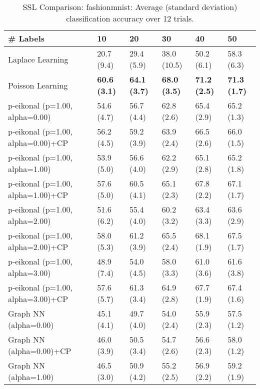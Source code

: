 \documentclass{article}
\begin{document}
\begin{table*}[t!]
\vspace{-3mm}
\caption{SSL Comparison: fashionmnist: Average (standard deviation) classification accuracy over 12 trials.}
\vspace{-3mm}
\label{tab:SSL Comparison: fashionmnist}
\vskip 0.15in
\begin{center}
\begin{small}
\begin{sc}
\begin{tabular}{llllll}
\toprule
\# Labels&\textbf{10}&\textbf{20}&\textbf{30}&\textbf{40}&\textbf{50}\\
\midrule
Laplace Learning&20.7 (9.4)      &29.4 (5.9)      &38.0 (10.5)      &50.2 (6.1)      &58.3 (6.3)      \\
Poisson Learning&{\bf 60.6 (3.1)}&{\bf 64.1 (3.7)}&{\bf 68.0 (3.5)}&{\bf 71.2 (2.5)}&{\bf 71.3 (1.7)}\\
p-eikonal (p=1.00, alpha=0.00)&54.6 (4.7)      &56.7 (4.4)      &62.8 (2.6)      &65.4 (2.9)      &65.2 (1.3)      \\
p-eikonal (p=1.00, alpha=0.00)+CP&56.2 (4.5)      &59.2 (3.9)      &63.9 (2.4)      &66.5 (2.6)      &66.0 (1.5)      \\
p-eikonal (p=1.00, alpha=1.00)&53.9 (5.0)      &56.6 (4.0)      &62.2 (2.9)      &65.1 (2.8)      &65.2 (1.8)      \\
p-eikonal (p=1.00, alpha=1.00)+CP&57.6 (5.0)      &60.5 (4.1)      &65.1 (2.3)      &67.8 (2.2)      &67.1 (1.7)      \\
p-eikonal (p=1.00, alpha=2.00)&51.6 (6.2)      &55.4 (4.0)      &60.2 (3.2)      &63.4 (3.3)      &63.6 (2.9)      \\
p-eikonal (p=1.00, alpha=2.00)+CP&58.0 (5.3)      &61.2 (3.9)      &65.5 (2.4)      &68.1 (1.9)      &67.5 (1.7)      \\
p-eikonal (p=1.00, alpha=3.00)&48.9 (7.4)      &54.0 (4.5)      &58.0 (3.3)      &61.0 (3.6)      &61.6 (3.8)      \\
p-eikonal (p=1.00, alpha=3.00)+CP&57.6 (5.7)      &61.3 (3.4)      &64.9 (2.8)      &67.7 (1.9)      &67.4 (1.6)      \\
Graph NN (alpha=0.00)&45.1 (4.1)      &49.7 (4.0)      &54.0 (2.4)      &55.9 (2.3)      &57.5 (1.2)      \\
Graph NN (alpha=0.00)+CP&46.0 (3.9)      &50.5 (3.4)      &54.7 (2.6)      &56.6 (2.3)      &58.0 (1.2)      \\
Graph NN (alpha=1.00)&46.5 (3.0)      &50.9 (4.2)      &55.2 (2.5)      &56.9 (2.2)      &59.2 (1.9)      \\

\end{tabular}
\end{sc}
\end{small}
\end{center}
\end{table*}
\end{document}

